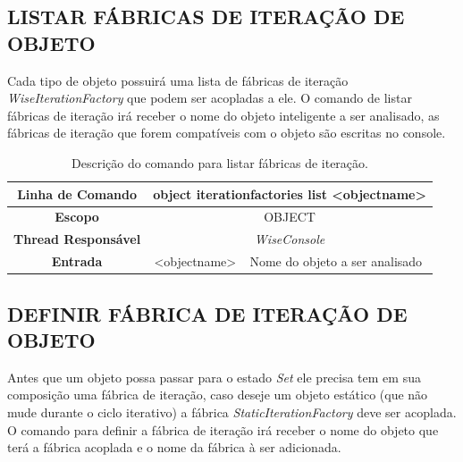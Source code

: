 \subsection{LISTAR FÁBRICAS DE ITERAÇÃO DE OBJETO}\label{sec:iteration_factories_list}

Cada tipo de objeto possuirá uma lista de fábricas de iteração \textit{WiseIteration}\textit{Factory} que podem ser acopladas a ele. O comando de listar fábricas de iteração irá receber o nome do objeto inteligente a ser analisado, as fábricas de iteração que forem compatíveis com o objeto são escritas no console.

\begin{center}
	\begin{table}[!htbp]
		\begin{tabularx}{\textwidth}{c|c|X}
			\toprule
			\textbf{Linha de Comando} & \multicolumn{2}{c}{object iteration\underline{\space\space}factories list <object\underline{\space\space}name>} \\
			\midrule
			\textbf{Escopo} & \multicolumn{2}{c}{OBJECT} \\
			\hline
			\textbf{Thread Responsável} & \multicolumn{2}{c}{\textit{WiseConsole}} \\
			\hline
			\textbf{Entrada} & <object\underline{\space\space}name> & Nome do objeto a ser analisado \\
			\bottomrule
		\end{tabularx}
		\caption{Descrição do comando para listar fábricas de iteração.}
		\label{tab:iteration_factories_list}
	\end{table}
\end{center}

\subsection{DEFINIR FÁBRICA DE ITERAÇÃO DE OBJETO}\label{sec:iteration_factories_set}

Antes que um objeto possa passar para o estado \textit{Set} ele precisa tem em sua composição uma fábrica de iteração, caso deseje um objeto estático (que não mude durante o ciclo iterativo) a fábrica \textit{StaticIterationFactory} deve ser acoplada. O comando para definir a fábrica de iteração irá receber o nome do objeto que terá a fábrica acoplada e o nome da fábrica à ser adicionada.

